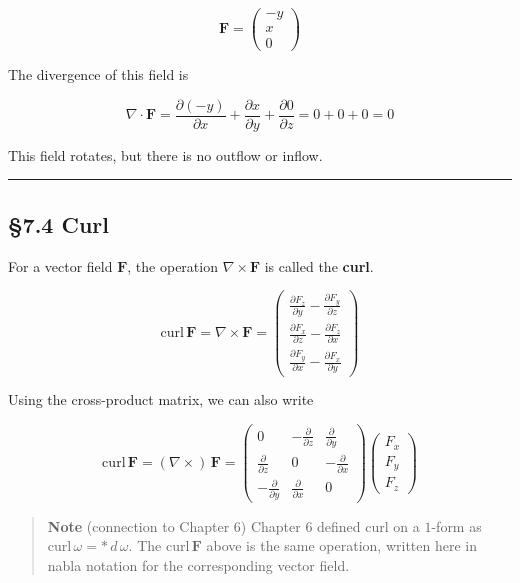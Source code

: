 \[
\mathbf{F}
=
\begin{pmatrix}
-y\\
x\\
0
\end{pmatrix}
\]

The divergence of this field is

\[\nabla \cdot \mathbf{F} = \frac{\partial (-y)}{\partial x} + \frac{\partial x}{\partial y} + \frac{\partial 0}{\partial z} = 0 + 0 + 0 = 0\]

This field rotates, but there is no outflow or inflow.

\begin{center}\rule{0.5\linewidth}{0.5pt}\end{center}

\hypertarget{curl}{%
\subsection{§7.4 Curl}\label{curl}}

For a vector field \(\mathbf{F}\), the operation
\(\nabla\times\mathbf{F}\) is called the \textbf{curl}.

\[\mathrm{curl}\,\mathbf{F} = \nabla \times \mathbf{F} = \begin{pmatrix}
\frac{\partial F_z}{\partial y} - \frac{\partial F_y}{\partial z} \\[0.5em]
\frac{\partial F_x}{\partial z} - \frac{\partial F_z}{\partial x} \\[0.5em]
\frac{\partial F_y}{\partial x} - \frac{\partial F_x}{\partial y}
\end{pmatrix}\]

Using the cross-product matrix, we can also write

\[\mathrm{curl}\,\mathbf{F} = (\nabla \times)\,\mathbf{F} = \begin{pmatrix}
0 & -\frac{\partial}{\partial z} & \frac{\partial}{\partial y} \\[0.3em]
\frac{\partial}{\partial z} & 0 & -\frac{\partial}{\partial x} \\[0.3em]
-\frac{\partial}{\partial y} & \frac{\partial}{\partial x} & 0
\end{pmatrix}\begin{pmatrix}
F_x \\ F_y \\ F_z
\end{pmatrix}\]

\begin{quote}
\textbf{Note} (connection to Chapter 6) Chapter 6 defined curl on a
\(1\)-form as \(\mathrm{curl}\,\omega = \ast\,d\,\omega\). The
\(\mathrm{curl}\,\mathbf{F}\) above is the same operation, written here
in nabla notation for the corresponding vector field.
\end{quote}

